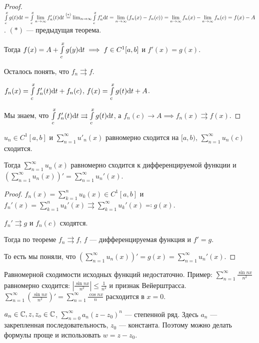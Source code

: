 \begin{proof}
    $\int\limits_c^x g(t)\mathrm{d}t = \int\limits_c^x \lim\limits_{n \to \infty} f_n'(t) \mathrm{d}t \overset{(*)} = \lim_{n \to \infty} \int\limits_c^x f_n'\mathrm{d}t = \lim\limits_{n \to \infty} (f_n(x) - f_n(c)) = \lim\limits_{n \to \infty} f_n(x) - \lim\limits_{n \to \infty} f_n(c) = f(x) - A$. $(*)$ --- предыдущая теорема.

    Тогда $f(x) = A + \int\limits_c^x g(y)\mathrm{d}t \implies f \in C^1[a, b]$ и  $f'(x) = g(x)$.

    Осталось понять, что  $f_n \rightrightarrows f$.

     $f_n(x) = \int\limits_c^x f_n'(t)\mathrm{d}t + f_n(c)$,  $f(x) = \int\limits_c^x g(t)\mathrm{d}t + A$.

     Мы знаем, что  $\int\limits_c^x f_n'(t)\mathrm{d}t \rightrightarrows \int\limits_c^xg(t)\mathrm{d}t$, а $f_n(c) \to A \implies f_n(x) \rightrightarrows f(x)$.
\end{proof}
\begin{consequence}
    $u_n \in C^1[a, b]$ и  $\sum\limits_{n=1}^\infty u'_n(x)$ равномерно сходится на  $[a, b)$,  $\sum\limits_{n=1}^\infty u_n(c)$ сходится. 

    Тогда  $\sum\limits_{n=1}^\infty u_n(x)$ равномерно сходится к дифференцируемой функции и $\left(\sum\limits_{n=1}^\infty u_n(x)\right)' = \sum\limits_{n=1}^\infty u_n'(x)$.
\end{consequence}
\begin{proof}
    $f_n(x) = \sum\limits_{k=1}^n u_k(x) \in C^1[a, b]$ и  $f_n'(x) = \sum\limits_{k=1}^n u_k'(x) \rightrightarrows \sum\limits_{k=1}^\infty u_k'(x) \eqqcolon g(x)$.

     $f_n' \rightrightarrows g$ и  $f_n(c)$ сходятся.

     Тогда по теореме  $f_n \rightrightarrows f$,  $f$ --- дифференцируемая функция и  $f' = g$.

     То есть мы поняли, что $\left(\sum\limits_{n=1}^\infty u_n(x)\right)' = g(x) = \sum\limits_{n=1}^\infty u_n'(x)$. 
\end{proof}
\begin{remark}
    Равномерной сходимости исходных функций недостаточно. Пример: $\sum\limits_{n=1}^\infty \frac{\sin nx}{n^2}$ равномерно сходится: $\left| \frac{\sin nx}{n^2} \right| \le \frac{1}{n^2}$ и признак Вейерштрасса. $\sum\limits_{n=1}^\infty \left(\frac{\sin nx}{n^2}\right)' = \sum\limits_{n=1}^\infty \frac{\cos nx}{n}$ расходится в $x = 0$.
\end{remark}
\begin{definition}
    $a_n \in \mathbb{C}, z, z_o \in \mathbb{C}$,  $\sum\limits_{n=0}^\infty a_n(z-z_0)^n$ --- степенной ряд. Здесь $a_n$ --- закрепленная последовательность,  $z_0$ --- константа. Поэтому можно делать формулы проще и использовать  $w = z - z_0$.
\end{definition}

